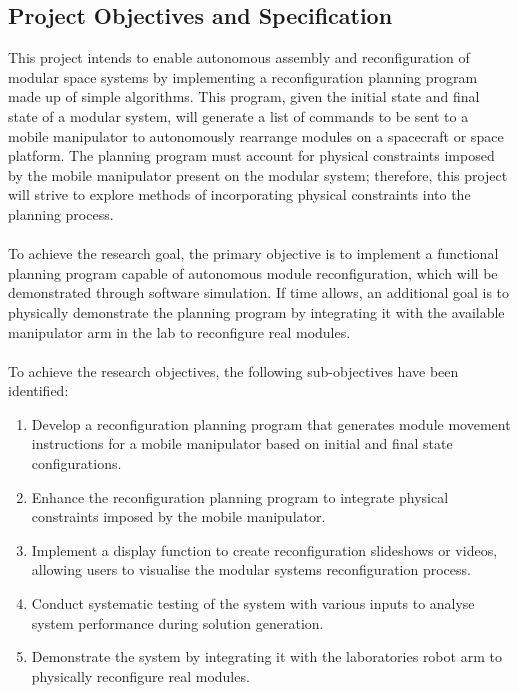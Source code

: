 \subsection{Project Objectives and Specification}
This project intends to enable autonomous assembly and reconfiguration of modular space systems by implementing a reconfiguration planning program made up of simple algorithms. This program, given the initial state and final state of a modular system, will generate a list of commands to be sent to a mobile manipulator to autonomously rearrange modules on a spacecraft or space platform. The planning program must account for physical constraints imposed by the mobile manipulator present on the modular system; therefore, this project will strive to explore methods of incorporating physical constraints into the planning process. 
\\\\
To achieve the research goal, the primary objective is to implement a functional planning program capable of autonomous module reconfiguration, which will be demonstrated through software simulation. If time allows, an additional goal is to physically demonstrate the planning program by integrating it with the available manipulator arm in the lab to reconfigure real modules.
\\\\
To achieve the research objectives, the following sub-objectives have been identified:
\begin{enumerate}[]
	\item Develop a reconfiguration planning program that generates module movement instructions for a mobile manipulator based on initial and final state configurations.
	
	\item Enhance the reconfiguration planning program to integrate physical constraints imposed by the mobile manipulator.
	
	\item Implement a display function to create reconfiguration slideshows or videos, allowing users to visualise the modular systems reconfiguration process.
	
	\item Conduct systematic testing of the system with various inputs to analyse system performance during solution generation.
	
	\item Demonstrate the system by integrating it with the laboratories robot arm to physically reconfigure real modules.
\end{enumerate}

